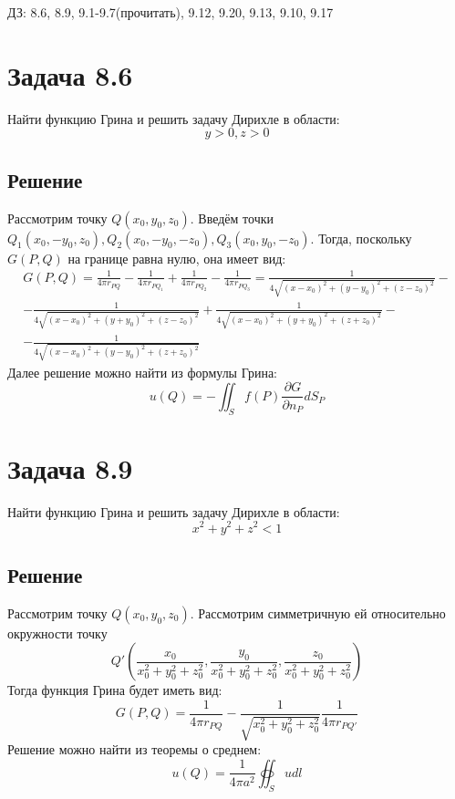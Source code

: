 \documentclass[11pt]{article}
\author{Sergey Makarov}
\date{\today}
\title{}
\def\zall{\setcounter{lem}{0}\setcounter{cnsqnc}{0}\setcounter{th}{0}\setcounter{Cmt}{0}\setcounter{equation}{0}}
\newcounter{lem}\setcounter{lem}{0}
\newcounter{th}\setcounter{th}{0}
\newcounter{cnsqnc}\setcounter{cnsqnc}{0}
\newcounter{Cmt}\setcounter{Cmt}{0}
\begin{document}
\zall

ДЗ: 8.6, 8.9, 9.1-9.7(прочитать), 9.12, 9.20, 9.13, 9.10, 9.17
\section{Задача 8.6}
\label{sec:orgd86bd9c}
Найти функцию Грина и решить задачу Дирихле в области:
\begin{equation}
y > 0, z > 0
\end{equation}
\subsection{Решение}
\label{sec:org33efbd0}
Рассмотрим точку $Q(x_0, y_0, z_0)$. Введём точки $Q_1(x_0, -y_0, z_0), Q_2(x_0, -y_0, -z_0), Q_3(x_0, y_0, -z_0)$.
Тогда, поскольку $G(P, Q)$ на границе равна нулю, она имеет вид:
\begin{multline}
G(P, Q) = \frac1{4\pi r_{PQ}} - \frac1{4\pi r_{PQ_1}} + \frac1{4\pi r_{PQ_2}} - \frac1{4\pi r_{PQ_3}} =
\frac1{4\sqrt{(x - x_0)^2 + (y - y_0)^2 + (z - z_0)^2}} - \\
- \frac1{4\sqrt{(x - x_0)^2 + (y + y_0)^2 + (z - z_0)^2}} +
\frac1{4\sqrt{(x - x_0)^2 + (y + y_0)^2 + (z + z_0)^2}} - \\
- \frac1{4\sqrt{(x - x_0)^2 + (y - y_0)^2 + (z + z_0)^2}}
\end{multline}
Далее решение можно найти из формулы Грина:
\begin{equation}
u(Q) = -\iint_Sf(P)\frac{\partial G}{\partial n_P}dS_P
\end{equation}
\section{Задача 8.9}
\label{sec:org78fab1e}
Найти функцию Грина и решить задачу Дирихле в области:
\begin{equation}
x^2 + y^2 + z^2 < 1
\end{equation}
\subsection{Решение}
\label{sec:org54a4554}
Рассмотрим точку $Q(x_0, y_0, z_0)$. Рассмотрим симметричную ей относительно окружности точку
$$Q'\left(\frac{x_0}{x_0^2 + y_0^2 + z_0^2}, \frac{y_0}{x_0^2 + y_0^2 + z_0^2}, \frac{z_0}{x_0^2 + y_0^2 + z_0^2}\right)$$
Тогда функция Грина будет иметь вид:
\begin{equation}
G(P, Q) = \frac1{4\pi r_{PQ}} - \frac1{\sqrt{x_0^2 + y_0^2 + z_0^2}}\frac1{4\pi r_{PQ'}}
\end{equation}
Решение можно найти из теоремы о среднем:
\begin{equation}
u(Q) = \frac1{4\pi a^2}\oiint_Sudl
\end{equation}
\end{document}
